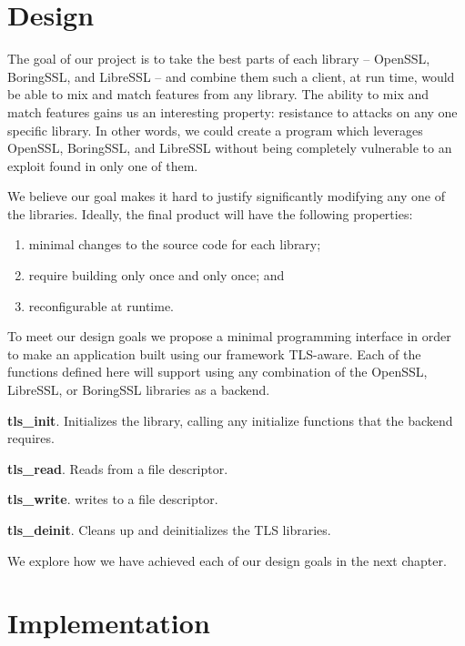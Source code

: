 \documentclass[12pt,oneside]{report}
\begin{document}
\cleardoublepage

\chapter{Design}
\label{sec:design}

The goal of our project is to take the best parts of each library -- OpenSSL,
BoringSSL, and LibreSSL -- and combine them such a client, at run time, would be
able to mix and match features from any library. The ability to mix and match
features gains us an interesting property: resistance to attacks on any one
specific library. In other words, we could create a program which leverages
OpenSSL, BoringSSL, and LibreSSL without being completely vulnerable to an
exploit found in only one of them.

We believe our goal makes it hard to justify significantly modifying any one of
the libraries. Ideally, the final product will have the following properties:
\begin{enumerate}
	\item minimal changes to the source code for each library;
	\item require building only once and only once; and
	\item reconfigurable at runtime.
\end{enumerate}

\newpage

To meet our design goals we propose a minimal programming interface in order to
make an application built using our framework TLS-aware. Each of the functions
defined here will support using any combination of the OpenSSL, LibreSSL, or
BoringSSL libraries as a backend.

\textbf{tls\_init}. Initializes the library, calling any initialize functions
that the backend requires.

\textbf{tls\_read}. Reads from a file descriptor.

\textbf{tls\_write}. writes to a file descriptor.

\textbf{tls\_deinit}. Cleans up and deinitializes the TLS libraries.

We explore how we have achieved each of our design goals in the next chapter.

\cleardoublepage

\chapter{Implementation}
\label{sec:impl}
\end{document}
